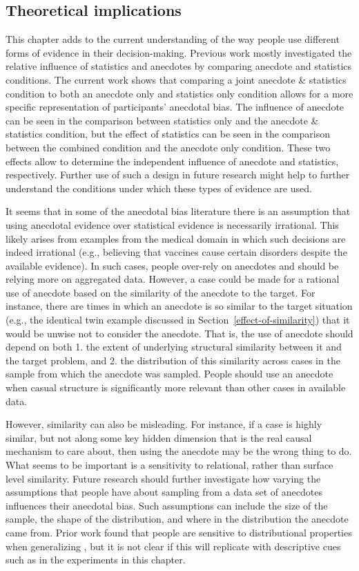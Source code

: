 \documentclass[a4paper, nobind, dvipsnames]{templates/ociamthesis}
\theoremstyle{definition}
\theoremstyle{definition}
\theoremstyle{definition}
\theoremstyle{definition}
\theoremstyle{remark}
\begin{document}
\subsection{Theoretical implications}

This chapter adds to the current understanding of the way people use different
forms of evidence in their decision-making. Previous work mostly investigated
the relative influence of statistics and anecdotes by comparing anecdote and
statistics conditions. The current work shows that comparing a joint anecdote \&
statistics condition to both an anecdote only and statistics only condition
allows for a more specific representation of participants' anecdotal bias. The
influence of anecdote can be seen in the comparison between statistics only and
the anecdote \& statistics condition, but the effect of statistics can be seen in
the comparison between the combined condition and the anecdote only condition.
These two effects allow to determine the independent influence of anecdote and
statistics, respectively. Further use of such a design in future research might
help to further understand the conditions under which these types of evidence
are used.

It seems that in some of the anecdotal bias literature there is an assumption
that using anecdotal evidence over statistical evidence is necessarily
irrational. This likely arises from examples from the medical domain in which
such decisions are indeed irrational (e.g., believing that vaccines cause
certain disorders despite the available evidence). In such cases, people
over-rely on anecdotes and should be relying more on aggregated data. However, a
case could be made for a rational use of anecdote based on the similarity of the
anecdote to the target. For instance, there are times in which an anecdote is so
similar to the target situation (e.g., the identical twin example discussed in
Section~\ref{effect-of-similarity}) that it would be unwise not to consider the
anecdote. That is, the use of anecdote should depend on both 1. the extent of
underlying structural similarity between it and the target problem, and 2. the
distribution of this similarity across cases in the sample from which the
anecdote was sampled. People should use an anecdote when casual structure is
significantly more relevant than other cases in available data.

However, similarity can also be misleading. For instance, if a case is highly
similar, but not along some key hidden dimension that is the real causal
mechanism to care about, then using the anecdote may be the wrong thing to do.
What seems to be important is a sensitivity to relational, rather than surface
level similarity. Future research should further investigate how varying the
assumptions that people have about sampling from a data set of anecdotes
influences their anecdotal bias. Such assumptions can include the size of the
sample, the shape of the distribution, and where in the distribution the
anecdote came from. Prior work found that people are sensitive to distributional
properties when generalizing \autocite{carvalho2021}, but it is not clear if this will
replicate with descriptive cues such as in the experiments in this chapter.
\end{document}
